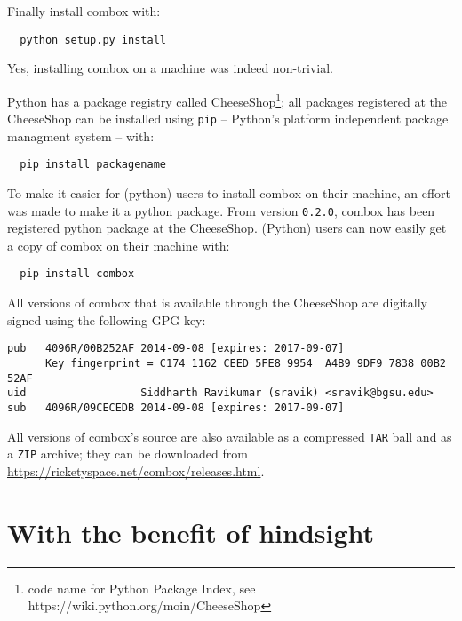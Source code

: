Finally install combox with:

\begin{verbatim}
  python setup.py install
\end{verbatim}

Yes, installing combox on a machine was indeed non-trivial.

Python has a package registry called CheeseShop\footnote{code name for
  Python Package Index, see https://wiki.python.org/moin/CheeseShop};
all packages registered at the CheeseShop can be installed using
\verb+pip+ -- Python's platform independent package managment
system\cite{py:pip} -- with:

\begin{verbatim}
  pip install packagename
\end{verbatim}

To make it easier for (python) users to install combox on their
machine, an effort was made to make it a python
package\cite{py:package-guide}. From version \verb+0.2.0+, combox has
been registered python package at the CheeseShop. (Python) users can
now easily get a copy of combox on their machine with:

\begin{verbatim}
  pip install combox
\end{verbatim}

All versions of combox that is available through the CheeseShop are
digitally signed using the following GPG key:

\begin{verbatim}
pub   4096R/00B252AF 2014-09-08 [expires: 2017-09-07]
      Key fingerprint = C174 1162 CEED 5FE8 9954  A4B9 9DF9 7838 00B2 52AF
uid                  Siddharth Ravikumar (sravik) <sravik@bgsu.edu>
sub   4096R/09CECEDB 2014-09-08 [expires: 2017-09-07]
\end{verbatim}

All versions of combox's source are also available as a compressed
\verb+TAR+ ball and as a \verb+ZIP+ archive; they can be downloaded
from \url{https://ricketyspace.net/combox/releases.html}.

\section{With the benefit of hindsight}\label{3-hindsight}

